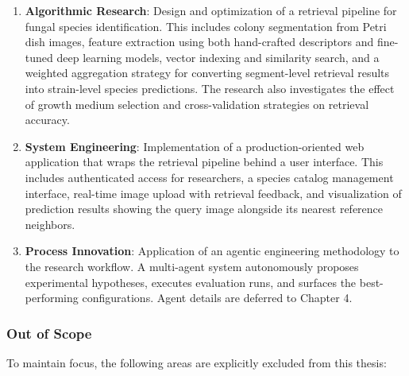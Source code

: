 \begin{enumerate}
\def\labelenumi{\arabic{enumi}.}
\item
  \textbf{Algorithmic Research}: Design and optimization of a retrieval pipeline for fungal species identification. This includes colony segmentation from Petri dish images, feature extraction using both hand-crafted descriptors and fine-tuned deep learning models, vector indexing and similarity search, and a weighted aggregation strategy for converting segment-level retrieval results into strain-level species predictions. The research also investigates the effect of growth medium selection and cross-validation strategies on retrieval accuracy.
\item
  \textbf{System Engineering}: Implementation of a production-oriented web application that wraps the retrieval pipeline behind a user interface. This includes authenticated access for researchers, a species catalog management interface, real-time image upload with retrieval feedback, and visualization of prediction results showing the query image alongside its nearest reference neighbors.
\item
  \textbf{Process Innovation}: Application of an agentic engineering methodology to the research workflow. A multi-agent system autonomously proposes experimental hypotheses, executes evaluation runs, and surfaces the best-performing configurations. Agent details are deferred to Chapter 4.
\end{enumerate}

\subsubsection{Out of Scope}\label{out-of-scope}

To maintain focus, the following areas are explicitly excluded from this thesis:

